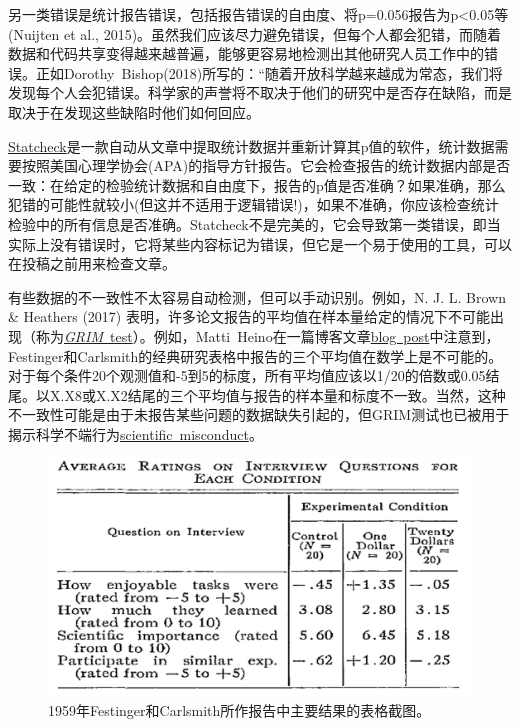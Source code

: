 \documentclass[
  letterpaper,
  DIV=11,
  numbers=noendperiod]{scrreprt}
\begin{document}
另一类错误是统计报告错误，包括报告错误的自由度、将p=0.056报告为p\textless0.05等(Nuijten
et al.,
2015)。虽然我们应该尽力避免错误，但每个人都会犯错，而随着数据和代码共享变得越来越普遍，能够更容易地检测出其他研究人员工作中的错误。正如Dorothy~Bishop(2018)所写的：``随着开放科学越来越成为常态，我们将发现每个人会犯错误。科学家的声誉将不取决于他们的研究中是否存在缺陷，而是取决于在发现这些缺陷时他们如何回应。

\href{http://statcheck.io/}{Statcheck}是一款自动从文章中提取统计数据并重新计算其p值的软件，统计数据需要按照美国心理学协会(APA)的指导方针报告。它会检查报告的统计数据内部是否一致：在给定的检验统计数据和自由度下，报告的p值是否准确？如果准确，那么犯错的可能性就较小(但这并不适用于逻辑错误!)，如果不准确，你应该检查统计检验中的所有信息是否准确。Statcheck不是完美的，它会导致第一类错误，即当实际上没有错误时，它将某些内容标记为错误，但它是一个易于使用的工具，可以在投稿之前用来检查文章。

有些数据的不一致性不太容易自动检测，但可以手动识别。例如，N. J. L. Brown
\& Heathers (2017)
表明，许多论文报告的平均值在样本量给定的情况下不可能出现（称为\href{http://nickbrown.fr/GRIM}{\emph{GRIM}}\href{http://nickbrown.fr/GRIM}{~test}）。例如，Matti~Heino在一篇博客文章\href{https://mattiheino.com/2016/11/13/legacy-of-psychology/}{blog~post}中注意到，Festinger和Carlsmith的经典研究表格中报告的三个平均值在数学上是不可能的。对于每个条件20个观测值和-5到5的标度，所有平均值应该以1/20的倍数或0.05结尾。以X.X8或X.X2结尾的三个平均值与报告的样本量和标度不一致。当然，这种不一致性可能是由于未报告某些问题的数据缺失引起的，但GRIM测试也已被用于揭示科学不端行为\href{https://en.wikipedia.org/wiki/GRIM_test}{scientific~misconduct}。

\begin{figure}

{\centering \includegraphics[width=1\textwidth,height=\textheight]{images/festinger_carlsmith.png}

}

\caption{\label{fig-festinger}1959年Festinger和Carlsmith所作报告中主要结果的表格截图。}

\end{figure}
\end{document}
